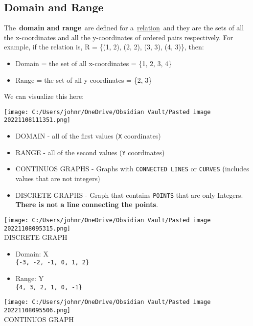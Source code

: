 \documentclass[
]{article}
\providecommand{\tightlist}{%
  \setlength{\itemsep}{0pt}\setlength{\parskip}{0pt}}
\begin{document}
\hypertarget{domain-and-range}{%
\subsection{Domain and Range}\label{domain-and-range}}

The~\textbf{domain and range}~are defined for
a~\href{https://www.cuemath.com/algebra/relations-in-math/}{relation}~and
they are the sets of all the x-coordinates and all the y-coordinates of
ordered pairs respectively. For example, if the relation is, R = \{(1,
2), (2, 2), (3, 3), (4, 3)\}, then:

\begin{itemize}
\tightlist
\item
  Domain = the set of all x-coordinates = \{1, 2, 3, 4\}
\item
  Range = the set of all y-coordinates = \{2, 3\}
\end{itemize}

We can visualize this here:

\texttt{[image: C:/Users/johnr/OneDrive/Obsidian Vault/Pasted image 20221108111351.png]}

\begin{itemize}
\item
  DOMAIN - all of the first values (\texttt{X} coordinates)
\item
  RANGE - all of the second values (\texttt{Y} coordinates)
\item
  CONTINUOS GRAPHS - Graphs with \texttt{CONNECTED\ LINES} or
  \texttt{CURVES} (includes values that are not integers)
\item
  DISCRETE GRAPHS - Graph that contains \texttt{POINTS} that are only
  Integers. \textbf{There is not a line connecting the points}.
\end{itemize}

\hfill\break
\hfill\break

\texttt{[image: C:/Users/johnr/OneDrive/Obsidian Vault/Pasted image 20221108095315.png]}\\
DISCRETE GRAPH

\begin{itemize}
\tightlist
\item
  Domain: X\\
  \texttt{\{-3,\ -2,\ -1,\ 0,\ 1,\ 2\}}
\item
  Range: Y\\
  \texttt{\{4,\ 3,\ 2,\ 1,\ 0,\ -1\}}
\end{itemize}

\texttt{[image: C:/Users/johnr/OneDrive/Obsidian Vault/Pasted image 20221108095506.png]}\\
CONTINUOS GRAPH
\end{document}
